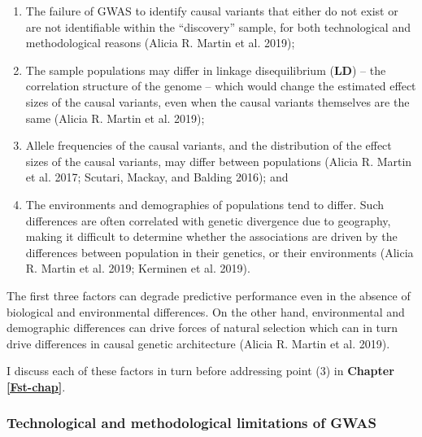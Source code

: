 \documentclass[
]{book}
\begin{document}
\begin{enumerate}
\def\labelenumi{\arabic{enumi}.}
\item
  The failure of GWAS to identify causal variants that either do not exist or are not identifiable within the ``discovery'' sample, for both technological and methodological reasons (Alicia R. Martin et al. 2019);
\item
  The sample populations may differ in linkage disequilibrium (\textbf{LD}) -- the correlation structure of the genome -- which would change the estimated effect sizes of the causal variants, even when the causal variants themselves are the same (Alicia R. Martin et al. 2019);
\item
  Allele frequencies of the causal variants, and the distribution of the effect sizes of the causal variants, may differ between populations (Alicia R. Martin et al. 2017; Scutari, Mackay, and Balding 2016); and
\item
  The environments and demographies of populations tend to differ. Such differences are often correlated with genetic divergence due to geography, making it difficult to determine whether the associations are driven by the differences between population in their genetics, or their environments (Alicia R. Martin et al. 2019; Kerminen et al. 2019).
\end{enumerate}

The first three factors can degrade predictive performance even in the absence of biological and environmental differences. On the other hand, environmental and demographic differences can drive forces of natural selection which can in turn drive differences in causal genetic architecture (Alicia R. Martin et al. 2019).

I discuss each of these factors in turn before addressing point (3) in \textbf{Chapter \ref{Fst-chap}}.

\hypertarget{fst-discovery-sec}{%
\subsubsection{Technological and methodological limitations of GWAS}\label{fst-discovery-sec}}
\end{document}
